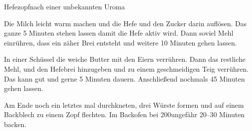 \begin{recipe}{Hefezopf}{nach einer unbekannten Uroma}\label{Hefezopf}
  \inglist

  \steps
  Die Milch leicht warm machen und die Hefe und den Zucker darin auflösen. Das
  ganze 5 Minuten stehen lassen damit die Hefe aktiv wird. Dann soviel Mehl
  einrühren, dass ein zäher Brei entsteht und weitere 10 Minuten gehen lassen.

  In einer Schüssel die weiche Butter mit den Eiern verrühren. Dann das
  restliche Mehl, und den Hefebrei hinzugeben und zu einem geschmeidigen Teig
  verrühren. Das kann gut und gerne 5 Minuten dauern. Anschließend nochmals 45
  Minuten gehen lassen. 
  
  Am Ende noch ein letztes mal durchkneten, drei Würste formen und auf einem
  Backblech zu einem Zopf flechten. Im Backofen bei 200\celsius ungefähr 20--30
  Minuten backen.

\end{recipe}
